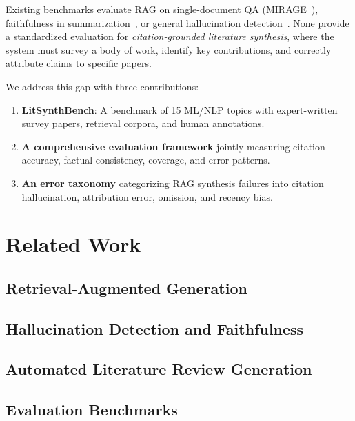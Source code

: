 \documentclass{article}
\begin{document}
Existing benchmarks evaluate RAG on single-document QA
(MIRAGE~\cite{xiong2024mirage}), faithfulness in
summarization~\cite{faithjudge2025}, or general hallucination
detection~\cite{confabulations2024}. None provide a standardized evaluation for
\emph{citation-grounded literature synthesis}, where the system must survey a
body of work, identify key contributions, and correctly attribute claims to
specific papers.

We address this gap with three contributions:

\begin{enumerate}
    \item \textbf{LitSynthBench}: A benchmark of 15 ML/NLP topics with
    expert-written survey papers, retrieval corpora, and human annotations.
    \item \textbf{A comprehensive evaluation framework} jointly measuring
    citation accuracy, factual consistency, coverage, and error patterns.
    \item \textbf{An error taxonomy} categorizing RAG synthesis failures into
    citation hallucination, attribution error, omission, and recency bias.
\end{enumerate}

\section{Related Work}

\subsection{Retrieval-Augmented Generation}

\subsection{Hallucination Detection and Faithfulness}

\subsection{Automated Literature Review Generation}

\subsection{Evaluation Benchmarks}
\end{document}
